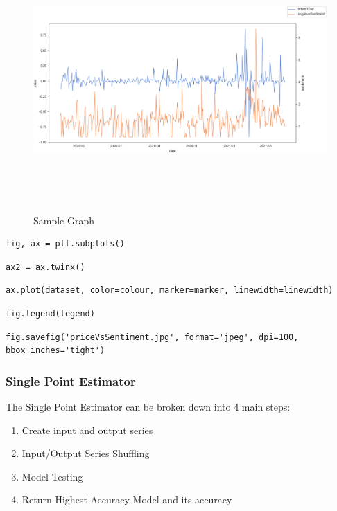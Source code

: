 \begin{figure}[h]
    \centering
    \includegraphics[width=15cm,height=10cm,keepaspectratio]{implementation/sampleGraph.png}
    \caption{Sample Graph}
    \label{fig:sampleGraph}
\end{figure}

\begin{lstlisting}[caption=Split Window into Multiple Subplots]
    fig, ax = plt.subplots()  
\end{lstlisting}
\begin{lstlisting}[caption=Create Overlapping Subplot]
    ax2 = ax.twinx()
\end{lstlisting}
\begin{lstlisting}[caption=Plot Dataset]
    ax.plot(dataset, color=colour, marker=marker, linewidth=linewidth) 
\end{lstlisting}
\begin{lstlisting}[caption=Plot Legend]
    fig.legend(legend)
\end{lstlisting}
\begin{lstlisting}[caption=Save picture of plot]
    fig.savefig('priceVsSentiment.jpg', format='jpeg', dpi=100, bbox_inches='tight')
\end{lstlisting}

\subsubsection{Single Point Estimator}

The Single Point Estimator can be broken down into 4 main steps:
\begin{enumerate}
    \item Create input and output series
    \item Input/Output Series Shuffling
    \item Model Testing
    \item Return Highest Accuracy Model and its accuracy
\end{enumerate}

